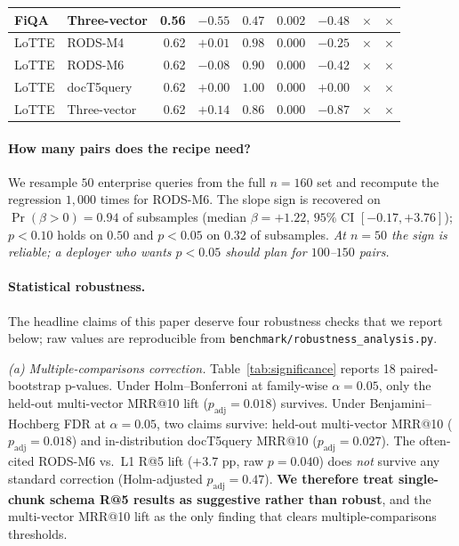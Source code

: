 \documentclass[11pt]{article}
\newcommand{\xmark}{$\times$}
\begin{document}
\begin{table}[H]
\begin{tabular}{llrrrrrcc}
FiQA       & Three-vector    & 0.56 & $-0.55$ & $0.47$  & $0.002$ & $-0.48$ & \xmark & \xmark \\
\midrule
LoTTE      & RODS-M4         & 0.62 & $+0.01$ & $0.98$  & $0.000$ & $-0.25$ & \xmark & \xmark \\
LoTTE      & RODS-M6         & 0.62 & $-0.08$ & $0.90$  & $0.000$ & $-0.42$ & \xmark & \xmark \\
LoTTE      & docT5query      & 0.62 & $+0.00$ & $1.00$  & $0.000$ & $+0.00$ & \xmark & \xmark \\
LoTTE      & Three-vector    & 0.62 & $+0.14$ & $0.86$  & $0.000$ & $-0.87$ & \xmark & \xmark \\
\bottomrule
\end{tabular}
\end{table}

\paragraph{How many pairs does the recipe need?} We resample $50$
enterprise queries from the full $n{=}160$ set and recompute the
regression $1{,}000$ times for RODS-M6. The slope sign is recovered
on $\Pr(\beta>0)=0.94$ of subsamples (median $\beta = +1.22$, $95\%$
CI $[-0.17, +3.76]$); $p<0.10$ holds on $0.50$ and $p<0.05$ on
$0.32$ of subsamples. \emph{At $n{=}50$ the sign is reliable; a
deployer who wants $p<0.05$ should plan for $100$--$150$ pairs.}

\paragraph{Statistical robustness.} The headline claims of this paper
deserve four robustness checks that we report below; raw values are
reproducible from \texttt{benchmark/robustness\_analysis.py}.

\textit{(a) Multiple-comparisons correction.} Table~\ref{tab:significance}
reports 18 paired-bootstrap p-values. Under Holm--Bonferroni at
family-wise $\alpha=0.05$, only the held-out multi-vector MRR@10 lift
($p_{\text{adj}}=0.018$) survives. Under Benjamini--Hochberg FDR at
$\alpha=0.05$, two claims survive: held-out multi-vector MRR@10
($p_{\text{adj}}=0.018$) and in-distribution docT5query MRR@10
($p_{\text{adj}}=0.027$). The often-cited RODS-M6 vs.\ L1 R@5 lift
($+3.7$ pp, raw $p=0.040$) does \emph{not} survive any standard
correction (Holm-adjusted $p_{\text{adj}}=0.47$). \textbf{We therefore
treat single-chunk schema R@5 results as suggestive rather than
robust}, and the multi-vector MRR@10 lift as the only finding that
clears multiple-comparisons thresholds.
\end{document}
